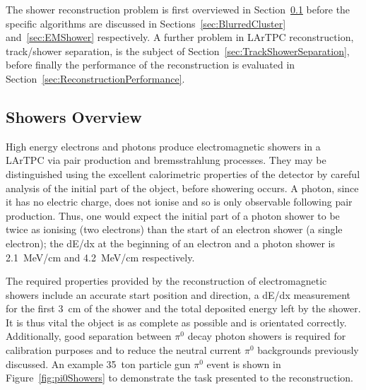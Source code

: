 The shower reconstruction problem is first overviewed in Section~\ref{sec:ShowersOverview} before the specific algorithms are discussed in Sections~\ref{sec:BlurredCluster} and~\ref{sec:EMShower} respectively.  A further problem in LArTPC reconstruction, track/shower separation, is the subject of Section~\ref{sec:TrackShowerSeparation}, before finally the performance of the reconstruction is evaluated in Section~\ref{sec:ReconstructionPerformance}.

\subsection{Showers Overview}\label{sec:ShowersOverview}

High energy electrons and photons produce electromagnetic showers in a LArTPC via pair production and bremsstrahlung processes.  They may be distinguished using the excellent calorimetric properties of the detector by careful analysis of the initial part of the object, before showering occurs.  A photon, since it has no electric charge, does not ionise and so is only observable following pair production.  Thus, one would expect the initial part of a photon shower to be twice as ionising (two electrons) than the start of an electron shower (a single electron); the dE/dx at the beginning of an electron and a photon shower is 2.1~MeV/cm and 4.2~MeV/cm respectively.

The required properties provided by the reconstruction of electromagnetic showers include an accurate start position and direction, a dE/dx measurement for the first 3~cm of the shower and the total deposited energy left by the shower.  It is thus vital the object is as complete as possible and is orientated correctly.  Additionally, good separation between $\pi^0$ decay photon showers is required for calibration purposes and to reduce the neutral current $\pi^0$ backgrounds previously discussed.  An example 35~ton particle gun $\pi^0$ event is shown in Figure~\ref{fig:pi0Showers} to demonstrate the task presented to the reconstruction.

